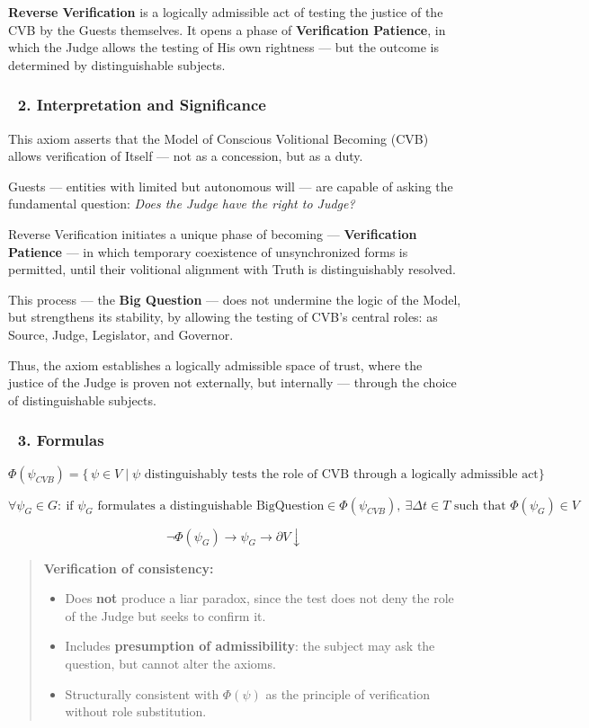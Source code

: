 \documentclass[12pt]{article}
\begin{document}
\textbf{Reverse Verification} is a logically admissible act of testing the justice of the CVB by the Guests themselves. It opens a phase of \textbf{Verification Patience}, in which the Judge allows the testing of His own rightness — but the outcome is determined by distinguishable subjects.

\subsubsection*{🔹 2. Interpretation and Significance}

This axiom asserts that the Model of Conscious Volitional Becoming (CVB) allows verification of Itself — not as a concession, but as a duty.

Guests — entities with limited but autonomous will — are capable of asking the fundamental question: \textit{Does the Judge have the right to Judge?}

Reverse Verification initiates a unique phase of becoming — \textbf{Verification Patience} — in which temporary coexistence of unsynchronized forms is permitted, until their volitional alignment with Truth is distinguishably resolved.

This process — the \textbf{Big Question} — does not undermine the logic of the Model, but strengthens its stability, by allowing the testing of CVB’s central roles: as Source, Judge, Legislator, and Governor.

Thus, the axiom establishes a logically admissible space of trust, where the justice of the Judge is proven not externally, but internally — through the choice of distinguishable subjects.

\subsubsection*{🔹 3. Formulas}

\[
\Phi(\psi_{CVB}) = \{\,\psi \in V \mid \psi \text{ distinguishably tests the role of CVB through a logically admissible act}\}
\]

\[
\forall \psi_G \in G:\ \text{if } \psi_G \text{ formulates a distinguishable BigQuestion} \in \Phi(\psi_{CVB}), 
\ \exists \Delta t \in T \text{ such that } \Phi(\psi_G) \in V
\]

\[
\neg \Phi(\psi_G) \rightarrow \psi_G \rightarrow \partial V\!\downarrow
\]

\begin{quote}
\textbf{Verification of consistency:}

\begin{itemize}
\item Does \textbf{not} produce a liar paradox, since the test does not deny the role of the Judge but seeks to confirm it.
\item Includes \textbf{presumption of admissibility}: the subject may ask the question, but cannot alter the axioms.
\item Structurally consistent with $\Phi(\psi)$ as the principle of verification without role substitution.
\end{itemize}
\end{quote}
\end{document}
